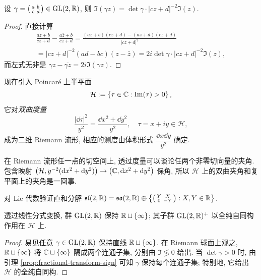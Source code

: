 \begin{lemma}\label{prop:fractional-transform-sign}
	设 $\gamma = \bigl( \begin{smallmatrix} a & b \\ c & d \end{smallmatrix} \bigr) \in \operatorname{GL}(2,\mathbb{R})$, 则 $\Im(\gamma z) = \det\gamma \cdot |cz+d|^{-2} \Im(z)$.
\end{lemma}
\begin{proof}
	直接计算
	\begin{multline*}
		\frac{az+b}{cz+d} - \frac{a\bar{z}+b}{c\bar{z}+d} = \frac{(az+b)(c\bar{z}+d) - (a\bar{z}+d)(cz+d)}{|cz+d|^2} \\
		= |cz+d|^{-2}(ad-bc)(z-\bar{z}) = 2i \det\gamma \cdot |cz+d|^{-2} \Im(z),
	\end{multline*}
	而左式无非是 $\gamma z - \overline{\gamma z} = 2i \Im(\gamma z)$.
\end{proof}

现在引入 Poincaré 上半平面
\[ \mathcal{H} := \left\{ \tau \in \mathbb{C}: \operatorname{Im}(\tau) > 0 \right\}, \]
它对\emph{双曲度量}
\[ \dfrac{|\dd \tau|^2}{y^2} = \dfrac{\dd x^2 + \dd y^2}{y^2}, \quad \tau = x + iy \in \mathcal{H}, \]
成为二维 Riemann 流形, 相应的测度由体积形式 $\dfrac{\dd x \dd y}{y^2}$ 确定. 

在 Riemann 流形任一点的切空间上, 透过度量可以谈论任两个非零切向量的夹角.  包含映射 $\left( \mathcal{H}, y^{-2}(\mathop{}\!\mathrm{d} x^2 + \mathop{}\!\mathrm{d} y^2) \right) \to \left( \mathbb{C}, \mathop{}\!\mathrm{d} x^2 + \mathop{}\!\mathrm{d} y^2 \right)$ 保角, 所以 $\mathcal{H}$ 上的双曲夹角和复平面上的夹角是一回事.

\begin{exercise}
	对 Lie 代数验证直和分解 $\mathfrak{sl}(2,\mathbb{R}) = \mathfrak{so}(2,\mathbb{R}) \oplus \left\{ \bigl( \begin{smallmatrix} Y & X \\ 0 & -Y \end{smallmatrix} \bigr) : X,Y \in \mathbb{R} \right\}$.
\end{exercise}

\begin{proposition}\label{prop:GL2R-action}
	透过线性分式变换, 群 $\operatorname{GL}(2,\mathbb{R})$ 保持 $\mathbb{R} \sqcup \{\infty\}$; 其子群 $\operatorname{GL}(2,\mathbb{R})^+$ 以全纯自同构作用在 $\mathcal{H}$ 上.
\end{proposition}
\begin{proof}
	易见任意 $\gamma \in \operatorname{GL}(2,\mathbb{R})$ 保持直线 $\mathbb{R} \sqcup \{\infty\}$. 在 Riemann 球面上观之, $\mathbb{R} \sqcup \{\infty\}$ 将 $\mathbb{C} \sqcup \{\infty\}$ 隔成两个连通子集, 分别由 $\Im \lessgtr 0$ 给出. 当 $\det\gamma > 0$ 时, 由引理 \ref{prop:fractional-transform-sign} 可知 $\gamma$ 保持每个连通子集; 特别地, 它给出 $\mathcal{H}$ 的全纯自同构.
\end{proof}

